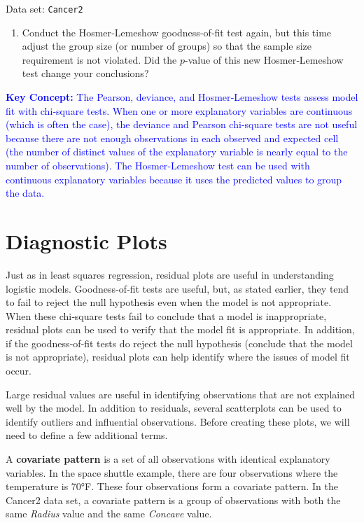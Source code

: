 \documentclass[
]{book}
\providecommand{\tightlist}{%
  \setlength{\itemsep}{0pt}\setlength{\parskip}{0pt}}
\begin{document}
Data set: \texttt{Cancer2}

\begin{enumerate}
\def\labelenumi{\arabic{enumi}.}
\setcounter{enumi}{31}
\tightlist
\item
  Conduct the Hosmer‐Lemeshow goodness‐of‐fit test again, but this time adjust the group size (or number of groups) so that the sample size requirement is not violated. Did the \(p\)-value of this new Hosmer‐Lemeshow test change your conclusions?
\end{enumerate}

\textbf{\textcolor{blue}{Key Concept:}}
\textcolor{blue}{The Pearson, deviance, and Hosmer‐Lemeshow tests assess model fit with chi‐square tests. When one or more explanatory variables are continuous (which is often the case), the deviance and Pearson chi‐square tests are not useful because there are not enough observations in each observed and expected cell (the number of distinct values of the explanatory variable is nearly equal to the number of observations). The Hosmer‐Lemeshow test can be used with continuous explanatory variables because it uses the predicted values to group the data. }

\hypertarget{diagnostic-plots}{%
\section{Diagnostic Plots}\label{diagnostic-plots}}

Just as in least squares regression, residual plots are useful in understanding logistic models. Goodness‐of‐fit tests are useful, but, as stated earlier, they tend to fail to reject the null hypothesis even when the model is not appropriate. When these chi‐square tests fail to conclude that a model is inappropriate, residual plots can be used to verify that the model fit is appropriate. In addition, if the goodness‐of‐fit tests do reject the null hypothesis (conclude that the model is not appropriate), residual plots can help identify where the issues of model fit occur.

Large residual values are useful in identifying observations that are not explained well by the model. In addition to residuals, several scatterplots can be used to identify outliers and influential observations. Before creating these plots, we will need to define a few additional terms.

A \textbf{covariate pattern} is a set of all observations with identical explanatory variables. In the space shuttle example, there are four observations where the temperature is 70°F. These four observations form a covariate pattern. In the Cancer2 data set, a covariate pattern is a group of observations with both the same \emph{Radius} value and the same \emph{Concave} value.
\end{document}
